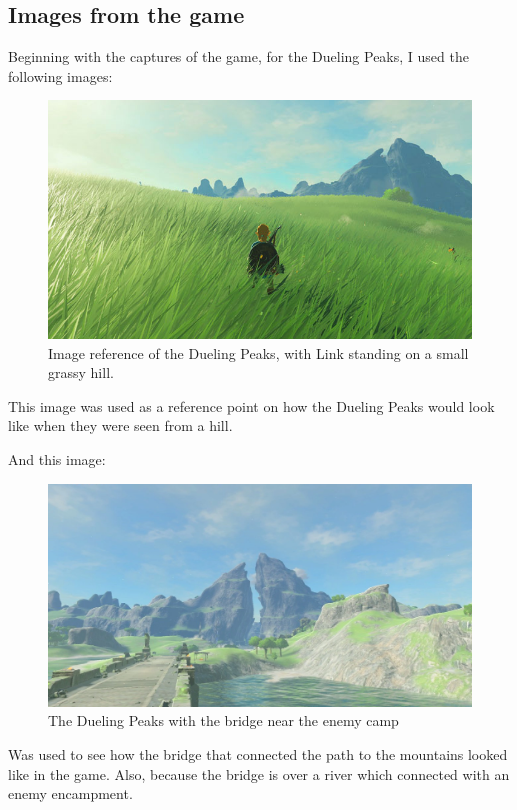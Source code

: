 \documentclass{cup-pan}
\begin{document}
    \subsection*{Images from the game}
    Beginning with the captures of the game, for the Dueling Peaks, I used the following images:\\
        \begin{figure}[H]
            \includegraphics[width=\textwidth]{Imagenes/Referencias/article_img03_1.jpg}
            \caption{Image reference of the Dueling Peaks, with Link standing on a small grassy hill.}
        \end{figure}
    This image was used as a reference point on how the Dueling Peaks would look like when they were seen from a hill. 

    And this image: 
        \begin{figure}[H]
            \includegraphics[width=\textwidth]{Imagenes/Referencias/Dueling_Peaks.png}
            \caption{The Dueling Peaks with the bridge near the enemy camp}
        \end{figure}
    Was used to see how the bridge that connected the path to the mountains looked like in the game.
    Also, because the bridge is over a river which connected with an enemy encampment. 
\end{document}
